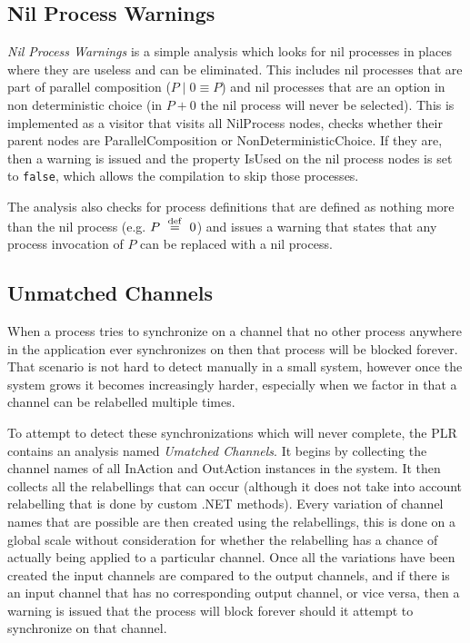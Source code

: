 \subsection{Nil Process Warnings}

	\textit{Nil Process Warnings} is a simple analysis which looks for nil processes 
	in places where they are useless and can be eliminated. This includes nil processes
	that are part of parallel composition ($P \mid 0 \equiv P$) and nil processes that
	are an option in non deterministic choice (in $P+0$ the nil process will never
	be selected). This is implemented as a visitor that visits all \textsf{NilProcess}
	nodes, checks whether their parent nodes are \textsf{ParallelComposition} or 
	\textsf{NonDeterministicChoice}. If they are, then a warning is issued and the
	property \textsf{IsUsed} on the nil process nodes is set to \texttt{false}, which
	allows the compilation to skip those processes.
	
	The analysis also checks for process definitions that are defined as nothing more
	than the nil process (e.g. $P \ \stackrel{\mathrm{def}}{=}\  0$) and issues a warning that states that
	any process invocation of $P$ can be replaced with a nil process.

\subsection{Unmatched Channels}

	When a process tries to synchronize on a channel that no other process 
	anywhere in the application ever synchronizes on then that process will be 
	blocked forever. That scenario is not hard to detect manually in a small 
	system, however once the system grows it becomes increasingly harder, 
	especially when we factor in that a channel can be relabelled multiple times. 
	
	To attempt to detect these synchronizations which will never complete, the 
	PLR contains an analysis named \textit{Umatched Channels}. It begins by
	collecting the channel names of all \textsf{InAction} and \textsf{OutAction}
	instances in the system. It then collects all the relabellings that can occur
	(although it does not take into account relabelling that is done by custom
	.NET methods). Every variation of channel names that are possible are then
	created using the relabellings, this is done on a global scale without 
	consideration for whether the relabelling has a chance of actually being
	applied to a particular channel. Once all the variations have been created
	the input channels are compared to the output channels, and if there is
	an input channel that has no corresponding output channel, or vice versa,
	then a warning is issued that the process will block forever should it 
	attempt to synchronize on that channel. 
	
